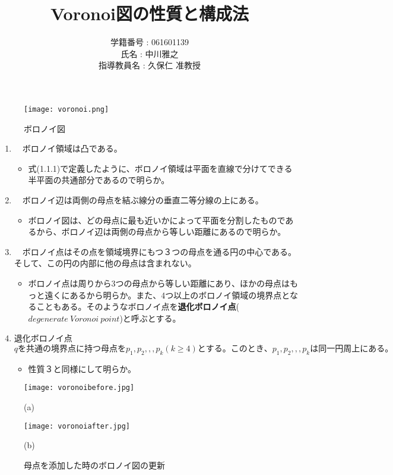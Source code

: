 \documentclass[10pt,a4paper,titlepage]{jsarticle}
\title{Voronoi図の性質と構成法}
\author{学籍番号 : 061601139\\
	氏名 : 中川雅之\\
	指導教員名 : 久保仁 准教授\\}
\begin{document}
\maketitle
\begin{figure}[b]
	\begin{center}
		\texttt{[image: voronoi.png]}
		\caption{ボロノイ図}
	\end{center}
\end{figure}



\begin{enumerate}[性質1]
	\item　ボロノイ領域は凸である。
		\begin{itemize}
		\item 式(1.1.1)で定義したように、ボロノイ領域は平面を直線で分けてできる半平面の共通部分であるので明らか。
		\end{itemize}
	\item　ボロノイ辺は両側の母点を結ぶ線分の垂直二等分線の上にある。
		\begin{itemize}
		\item ボロノイ図は、どの母点に最も近いかによって平面を分割したものであるから、ボロノイ辺は両側の母点から等しい距離にあるので明らか。
		\end{itemize}
	\item　ボロノイ点はその点を領域境界にもつ３つの母点を通る円の中心である。そして、この円の内部に他の母点は含まれない。
		\begin{itemize}
		\item ボロノイ点は周りから3つの母点から等しい距離にあり、ほかの母点はもっと遠くにあるから明らか。また、4つ以上のボロノイ領域の境界点となることもある。そのようなボロノイ点を{\bf 退化ボロノイ点}($degenerate~Voronoi~point$)と呼ぶとする。
		\end{itemize}
	\item 退化ボロノイ点$qを共通の境界点に持つ母点をp_1,p_2,,,p_k (k \geq 4)とする。このとき、p_1,p_2,,,p_kは同一円周上にある。$
		\begin{itemize}
		\item 性質３と同様にして明らか。
		\end{itemize}
\end{enumerate}







\begin{figure}[b]
	\centering
	\begin{minipage}{.4\textwidth}
		\texttt{[image: voronoibefore.jpg]}
		\caption{(a)}
	\end{minipage}
	\begin{minipage}{.4\textwidth}
		\texttt{[image: voronoiafter.jpg]}
		\caption{(b)}
	\end{minipage}
\caption{母点を添加した時のボロノイ図の更新}
\end{figure}
\end{document}
